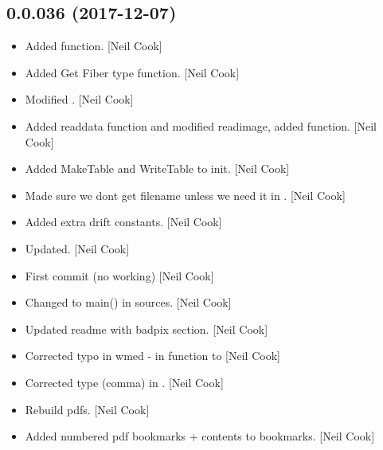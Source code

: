 \documentclass[a4paper,10pt,english]{report}
\begin{document}
\subsection{0.0.036 (2017-12-07)}
\label{\detokenize{misc/changelog:id516}}\begin{itemize}
\item {} 
Added  function. {[}Neil Cook{]}

\item {} 
Added Get Fiber type function. {[}Neil Cook{]}

\item {} 
Modified . {[}Neil Cook{]}

\item {} 
Added readdata function and modified readimage, added 
function. {[}Neil Cook{]}

\item {} 
Added MakeTable and WriteTable to init. {[}Neil Cook{]}

\item {} 
Made sure we dont get filename unless we need it in
. {[}Neil Cook{]}

\item {} 
Added extra drift constants. {[}Neil Cook{]}

\item {} 
Updated. {[}Neil Cook{]}

\item {} 
First commit (no working) {[}Neil Cook{]}

\item {} 
Changed  to main() in sources. {[}Neil Cook{]}

\item {} 
Updated readme with badpix section. {[}Neil Cook{]}

\item {} 
Corrected typo in wmed - in  function
 to  {[}Neil Cook{]}

\item {} 
Corrected type (comma) in . {[}Neil Cook{]}

\item {} 
Rebuild pdfs. {[}Neil Cook{]}

\item {} 
Added numbered pdf bookmarks + contents to bookmarks. {[}Neil Cook{]}


\end{itemize}
\end{document}
